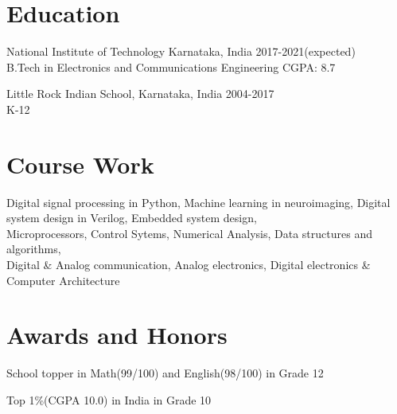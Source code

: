 \documentclass[letterpaper]{article}
\renewenvironment{itemize}{
  \begin{list}{}{
    \setlength{\leftmargin}{1.5em}
  }
}{
  \end{list}
}
\newcommand{\datefont}[1]{\textcolor{black!80}{\small{#1}}}
\begin{document}
\newpage
\section*{Education}
  \begin{itemize}
    \item National Institute of Technology Karnataka, India\hfill
    \datefont{2017-2021(expected)}
    \\
    \datefont{B.Tech in Electronics and Communications Engineering}
    \hfill{\datefont{CGPA: 8.7}}

    \item Little Rock Indian School, Karnataka, India\hfill
    \datefont{2004-2017}
    \\
    \datefont{K-12}
  \end{itemize}


\section*{Course Work}
  Digital signal processing in Python, Machine learning in neuroimaging, Digital system design in Verilog, Embedded system design, \\
  Microprocessors, Control Sytems, Numerical Analysis, Data structures and algorithms, \\
  Digital \& Analog communication, Analog electronics, Digital electronics \& Computer Architecture


\section*{Awards and Honors}
\begin{itemize}
  \item School topper in Math(99/100) and English(98/100) in Grade 12
  \item Top 1\%(CGPA 10.0) in India in Grade 10
\end{itemize}


\end{document}
